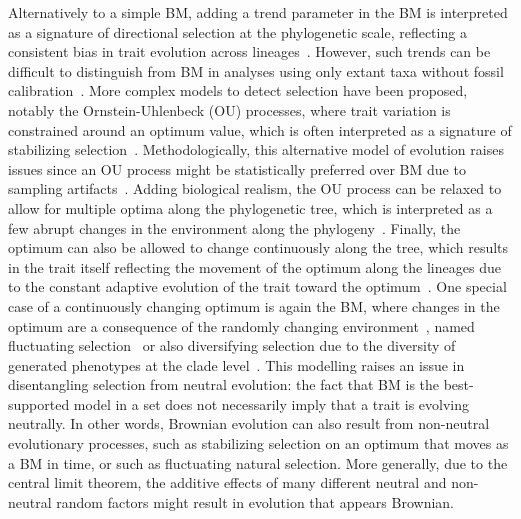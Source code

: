 \documentclass{article}
\begin{document}
Alternatively to a simple BM, adding a trend parameter in the BM is interpreted as a signature of directional selection at the phylogenetic scale, reflecting a consistent bias in trait evolution across lineages~\citep{silvestro_early_2019}.
However, such trends can be difficult to distinguish from BM in analyses using only extant taxa without fossil calibration~\citep{felsenstein_phylogenies_1988a}.
More complex models to detect selection have been proposed, notably the Ornstein-Uhlenbeck (OU) processes, where trait variation is constrained around an optimum value, which is often interpreted as a signature of stabilizing selection~\citep{hansen_stabilizing_1997, butler_phylogenetic_2004, beaulieu_modeling_2012}.
Methodologically, this alternative model of evolution raises issues since an OU process might be statistically preferred over BM due to sampling artifacts~\citep{silvestro_measurement_2015, cooper_cautionary_2016, price_detecting_2022}.
Adding biological realism, the OU process can be relaxed to allow for multiple optima along the phylogenetic tree, which is interpreted as a few abrupt changes in the environment along the phylogeny~\citep{ingram_surface_2013, uyeda_novel_2014, khabbazian_fast_2016, mitov_fast_2020, grabowski_cautionary_2023}.
Finally, the optimum can also be allowed to change continuously along the tree, which results in the trait itself reflecting the movement of the optimum along the lineages due to the constant adaptive evolution of the trait toward the optimum~\citep{hansen_translating_1996, hansen_three_2024}.
One special case of a continuously changing optimum is again the BM, where changes in the optimum are a consequence of the randomly changing environment~\citep{hansen_comparative_2008}, named fluctuating selection~\citep{holstad_evolvability_2024} or also diversifying selection due to the diversity of generated phenotypes at the clade level~\citep{latrille_detecting_2024}.
This modelling raises an issue in disentangling selection from neutral evolution: the fact that BM is the best-supported model in a set does not necessarily imply that a trait is evolving neutrally.
In other words, Brownian evolution can also result from non-neutral evolutionary processes, such as stabilizing selection on an optimum that moves as a BM in time, or such as fluctuating natural selection.
More generally, due to the central limit theorem, the additive effects of many different neutral and non-neutral random factors might result in evolution that appears Brownian.
\end{document}
